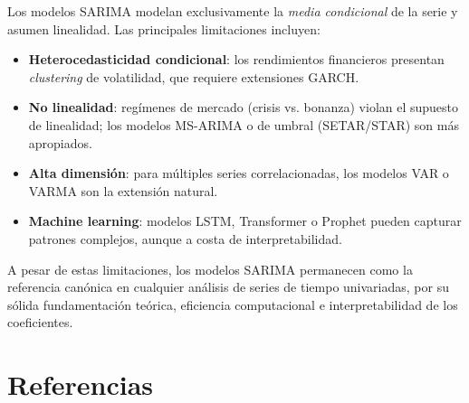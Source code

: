 \documentclass[12pt,a4paper]{article}
\begin{document}
Los modelos SARIMA modelan exclusivamente la \textit{media condicional} de la serie y asumen
linealidad. Las principales limitaciones incluyen:

\begin{itemize}
  \item \textbf{Heterocedasticidad condicional}: los rendimientos financieros presentan
        \textit{clustering} de volatilidad, que requiere extensiones GARCH.
  \item \textbf{No linealidad}: regímenes de mercado (crisis vs. bonanza) violan el supuesto
        de linealidad; los modelos MS-ARIMA o de umbral (SETAR/STAR) son más apropiados.
  \item \textbf{Alta dimensión}: para múltiples series correlacionadas, los modelos VAR
        o VARMA son la extensión natural.
  \item \textbf{Machine learning}: modelos LSTM, Transformer o Prophet pueden capturar
        patrones complejos, aunque a costa de interpretabilidad.
\end{itemize}

A pesar de estas limitaciones, los modelos SARIMA permanecen como la referencia canónica
en cualquier análisis de series de tiempo univariadas, por su sólida fundamentación
teórica, eficiencia computacional e interpretabilidad de los coeficientes.

\section*{Referencias}
\end{document}
